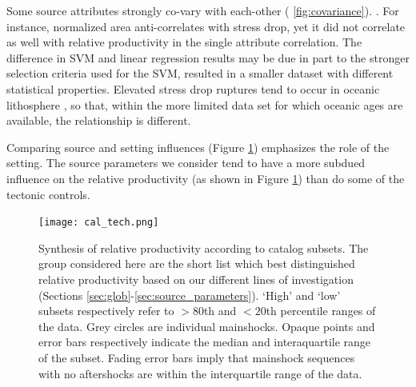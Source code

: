 \documentclass[draft, jgrga]{agujournal2018}
\begin{document}

Some source attributes strongly co-vary with each-other ( \ref{fig:covariance}). . For instance, normalized area anti-correlates with stress drop, yet it did not correlate as well with relative productivity in the single attribute correlation. The difference in SVM and linear regression results may be due in part to the stronger selection criteria used for the SVM, resulted in a smaller dataset with different statistical properties. Elevated stress drop ruptures tend to occur in oceanic lithosphere \citep{choy2004apparent}, so that, within the more limited data set for which oceanic ages are available, the relationship is different.

Comparing source and setting influences (Figure \ref{fig:caltech}) emphasizes the role of the setting. The source parameters we consider tend to have a more subdued influence on the relative productivity (as shown in Figure \ref{fig:caltech}) than do some of the tectonic controls. 

 \begin{figure}
        \centering
        \texttt{[image: cal\_tech.png]}
        \caption{Synthesis of relative productivity according to catalog subsets. The group considered here are the short list which best distinguished relative productivity based on our different lines of investigation (Sections \ref{sec:glob}-\ref{sec:source_parameters}). `High' and `low' subsets respectively refer to $>80$th and $<20$th percentile ranges of the data. Grey circles are individual mainshocks. Opaque points and error bars respectively indicate the median and interaquartile range of the subset. Fading error bars imply that mainshock sequences with no aftershocks are within the interquartile range of the data. }
        \label{fig:caltech}
    \end{figure}
\end{document}
